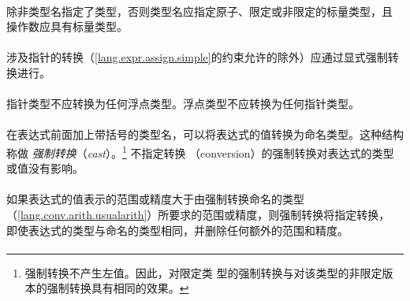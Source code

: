 
\syntax
\paragraph{}

\constraint
\paragraph{}
除非类型名指定了类型，否则类型名应指定原子、限定或非限定的标量类型，且
操作数应具有标量类型。

\paragraph{}
涉及指针的转换（\ref{lang.expr.assign.simple}的约束允许的除外）应通过显式强制转
换进行。

\paragraph{}
指针类型不应转换为任何浮点类型。浮点类型不应转换为任何指针类型。

\semantic
\paragraph{}
在表达式前面加上带括号的类型名，可以将表达式的值转换为命名类型。这种结构称做
\textit{强制转换}（\textit{cast}）。\footnote{强制转换不产生左值。因此，对限定类
型的强制转换与对该类型的非限定版本的强制转换具有相同的效果。} 不指定转换
（conversion）的强制转换对表达式的类型或值没有影响。

\paragraph{}
如果表达式的值表示的范围或精度大于由强制转换命名的类型
（\ref{lang.conv.arith.usualarith}）所要求的范围或精度，则强制转换将指定转换，
即使表达式的类型与命名的类型相同，并删除任何额外的范围和精度。


\syntax
\paragraph{}

